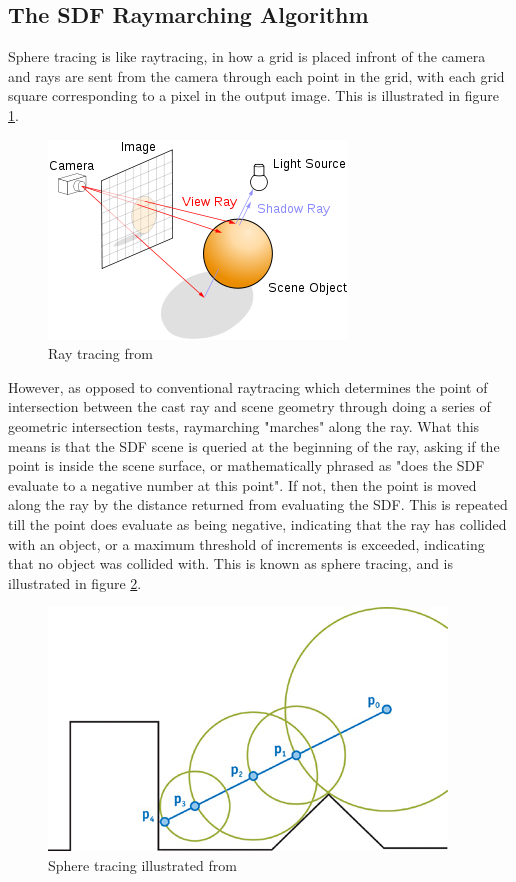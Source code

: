 \documentclass[10pt, openany]{book}
\begin{document}
\subsection{The SDF Raymarching Algorithm}

Sphere tracing is like raytracing, in how a grid is placed infront of the camera and rays are sent from the camera through each point in the grid, with each grid square corresponding to a pixel in the output image. This is illustrated in figure \ref{fig:raytracing}.

\begin{figure}[H]
	\centering
	\includegraphics[width=0.35\linewidth]{Raytracing}
	\caption{Ray tracing from \citep{wikipedia:raytracing}}
	\label{fig:raytracing}
\end{figure}

However, as opposed to conventional raytracing which determines the point of intersection between the cast ray and scene geometry through doing a series of geometric intersection tests, raymarching "marches" along the ray. What this means is that the SDF scene is queried at the beginning of the ray, asking if the point is inside the scene surface, or mathematically phrased as "does the SDF evaluate to a negative number at this point". If not, then the point is moved along the ray by the distance returned from evaluating the SDF. This is repeated till the point does evaluate as being negative, indicating that the ray has collided with an object, or a maximum threshold of increments is exceeded, indicating that no object was collided with. This is known as sphere tracing, and is illustrated in figure \ref{fig:sphere-tracing}.

\begin{figure}[H]
	\centering
	\includegraphics[width=0.35\linewidth]{Spheretracing}
	\caption{Sphere tracing illustrated from \citep{gpugems2}}
	\label{fig:sphere-tracing}
\end{figure}
\end{document}
